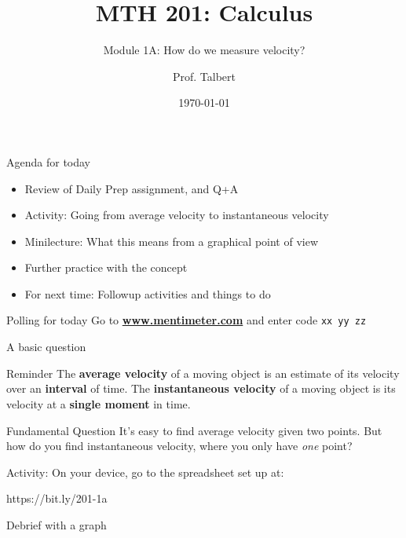 \documentclass{beamer}
\title{MTH 201: Calculus}
\subtitle{Module 1A: How do we measure velocity?}
\author{Prof. Talbert}
\institute{GVSU}
\date{\today}
\begin{document}
\frame{\titlepage}


\begin{frame}{Agenda for today}
    \begin{itemize}
        \item<1-> Review of Daily Prep assignment, and Q+A
        \item<2-> Activity: Going from average velocity to instantaneous velocity
        \item<3-> Minilecture: What this means from a graphical point of view 
        \item<4-> Further practice with the concept
        \item<5-> For next time: Followup activities and things to do 
    \end{itemize}
\end{frame}

\begin{frame}{Polling for today}
    \large{
    Go to \textbf{\url{www.mentimeter.com}} and enter code \texttt{xx yy zz} 
    }
    \end{frame}

\begin{frame}{A basic question}
    
    \begin{block}{Reminder}
        The \textbf{average velocity} of a moving object is an estimate of its velocity over an \textbf{interval} of time. The \textbf{instantaneous velocity} of a moving object is its velocity at a \textbf{single moment} in time. 
    \end{block}
    
    \begin{alertblock}{Fundamental Question}
        It's easy to find average velocity given two points. But how do you find instantaneous velocity, where you only have \emph{one} point? 
    \end{alertblock}
    
    Activity: On your device, go to the spreadsheet set up at: 
    
    \begin{center}
        https://bit.ly/201-1a
    \end{center}
    
    \end{frame}
    
\begin{frame}{Debrief with a graph}
        
\end{frame}
    
\end{document}
